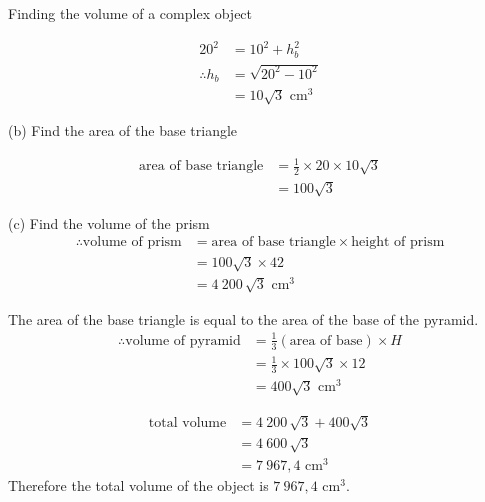\begin{wex}{Finding the volume of a complex object}
{\begin{align*}
  20^2 &= 10^2 + h_b^2 \\
  \therefore h_b &= \sqrt{20^2-10^2} \\
  &= 10 \sqrt{3}\mbox{ cm}^3
\end{align*}

(b) Find the area of the base triangle
% 

\begin{align*}
  \mbox{area of base triangle}
  &= \frac{1}{2} \times 20 \times 10 \sqrt{3} \\
  &= 100 \sqrt{3}
\end{align*}

(c) Find the volume of the prism
\begin{align*}
  \therefore \mbox{volume of prism}
  &= \mbox{area of base triangle} \times \mbox{height of prism} \\
  &= 100 \sqrt{3} \times 42 \\
  &= 4~200\,\sqrt{3}\mbox{ cm}^3
\end{align*}

The area of the base triangle is equal to the area of the base of the pyramid.
\begin{align*}
  \therefore \mbox{volume of pyramid}
  &= \frac{1}{3} (\mbox{area of base}) \times H \\
  &= \frac{1}{3} \times 100 \sqrt{3} \times 12 \\
  &= 400\sqrt{3}\mbox{ cm}^3
\end{align*}

\begin{align*}
  \mbox{total volume}
  &= 4~200\,\sqrt{3}+400\sqrt{3} \\
  &= 4~600\,\sqrt{3} \\
  &= 7~967,4\mbox{ cm}^3
\end{align*}
Therefore the total volume of the object is $7~967,4\mbox{ cm}^3$.
}
\end{wex}

